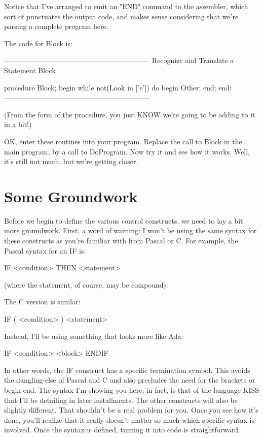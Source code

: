 \documentclass[float=false, crop=false]{standalone}
\begin{document}
Notice that I've arranged to emit an "END" command to the assembler, which sort
of punctuates the output code, and makes sense considering that we're parsing a
complete program here.

The code for Block is:

\begin{code}
{--------------------------------------------------------------}
{ Recognize and Translate a Statement Block }

procedure Block;
begin
   while not(Look in ['e']) do begin
      Other;
   end;
end;
{--------------------------------------------------------------}
\end{code}

(From the form of the procedure, you just KNOW we're going to be adding to it in
a bit!)

OK, enter these routines into your program. Replace the call to Block in the
main program, by a call to DoProgram. Now try it and see how it works. Well,
it's still not much, but we're getting closer.


\section{Some Groundwork}

Before we begin to define the various control constructs, we need to lay a bit
more groundwork. First, a word of warning: I won't be using the same syntax for
these constructs as you're familiar with from Pascal or C. For example, the
Pascal syntax for an IF is:


     IF <condition> THEN <statement>


(where the statement, of course, may be compound).

The C version is similar:


     IF ( <condition> ) <statement>


Instead, I'll be using something that looks more like Ada:


     IF <condition> <block> ENDIF


In other words, the IF construct has a specific termination symbol. This avoids
the dangling-else of Pascal and C and also precludes the need for the brackets
{} or begin-end. The syntax I'm showing you here, in fact, is that of the
language KISS that I'll be detailing in later installments. The other constructs
will also be slightly different. That shouldn't be a real problem for you. Once
you see how it's done, you'll realize that it really doesn't matter so much
which specific syntax is involved. Once the syntax is defined, turning it into
code is straightforward.
\end{document}
